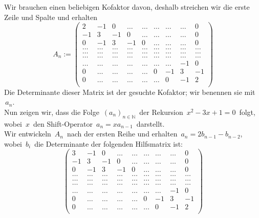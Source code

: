 Wir brauchen einen beliebigen Kofaktor davon, deshalb streichen wir die erste Zeile und Spalte und erhalten\\
\begin{equation*}
A_n:=
\begin{pmatrix}
2&-1&0&\ldots&\ldots&\ldots&\ldots&\ldots&0\\
-1&3&-1&0&\ldots&\ldots&\ldots&\ldots&0\\
0&-1&3&-1&0&\ldots&\ldots&\ldots&0\\
\ldots&\ldots&\ldots&\ldots&\ldots&\ldots&\ldots&\ldots&\ldots\\
\ldots&\ldots&\ldots&\ldots&\ldots&\ldots&\ldots&\ldots&\ldots\\
\ldots&\ldots&\ldots&\ldots&\ldots&\ldots&\ldots&\ldots&\ldots\\
\ldots&\ldots&\ldots&\ldots&\ldots&\ldots&\ldots&-1&0\\
0&\ldots&\ldots&\ldots&\ldots&0&-1&3&-1\\
0&\ldots&\ldots&\ldots&\ldots&\ldots&0&-1&2\\
\end{pmatrix}
\end{equation*}
Die Determinante dieser Matrix ist der gesuchte Kofaktor; wir benennen sie mit $\,a_n$.\;\\
Nun zeigen wir, dass die Folge $\,(a_n)_{n \in \mathbb{N}}\,$ der Rekursion $\,x^2-3x+1=0\,$ folgt, \\wobei $\,x\,$ den Shift-Operator $\,a_n = xa_{n-1}\,$ darstellt.\\
Wir entwickeln $\,A_n\,$ nach der ersten Reihe und erhalten $\,a_n = 2b_{n-1} - b_{n-2}$,\; wobei $\,b_i\,$ die Determinante der folgenden Hilfsmatrix ist:\\
\begin{equation*}
\begin{pmatrix}
3&-1&0&\ldots&\ldots&\ldots&\ldots&\ldots&0\\
-1&3&-1&0&\ldots&\ldots&\ldots&\ldots&0\\
0&-1&3&-1&0&\ldots&\ldots&\ldots&0\\
\ldots&\ldots&\ldots&\ldots&\ldots&\ldots&\ldots&\ldots&\ldots\\
\ldots&\ldots&\ldots&\ldots&\ldots&\ldots&\ldots&\ldots&\ldots\\
\ldots&\ldots&\ldots&\ldots&\ldots&\ldots&\ldots&\ldots&\ldots\\
\ldots&\ldots&\ldots&\ldots&\ldots&\ldots&\ldots&-1&0\\
0&\ldots&\ldots&\ldots&\ldots&0&-1&3&-1\\
0&\ldots&\ldots&\ldots&\ldots&\ldots&0&-1&2\\
\end{pmatrix}
\end{equation*}
